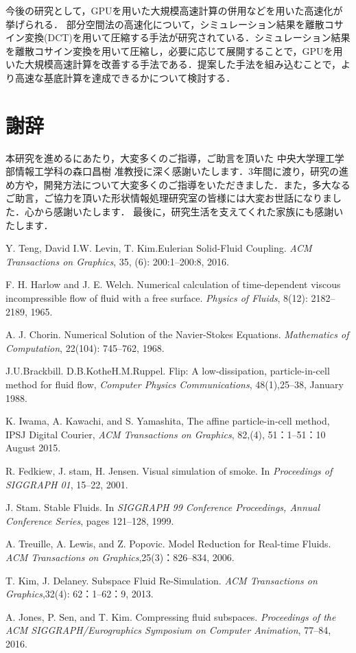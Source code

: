 \documentclass[a4j,12pt]{jreport}
\def\syaji{ \chapter*{謝辞} \addcontentsline{toc}{chapter}{謝辞}}
\begin{document}
今後の研究として，GPUを用いた大規模高速計算の併用などを用いた高速化が挙げられる．
部分空間法の高速化について，シミュレーション結果を離散コサイン変換(DCT)を用いて圧縮する手法\cite{subspaceDCT}が研究されている．シミュレーション結果を離散コサイン変換を用いて圧縮し，必要に応じて展開することで，GPUを用いた大規模高速計算を改善する手法である．提案した手法を組み込むことで，より高速な基底計算を達成できるかについて検討する．


\syaji
\par
本研究を進めるにあたり，大変多くのご指導，ご助言を頂いた
中央大学理工学部情報工学科の森口昌樹 准教授に深く感謝いたします．3年間に渡り，研究の進め方や，開発方法について大変多くのご指導をいただきました．また，多大なるご助言，ご協力を頂いた形状情報処理研究室の皆様には大変お世話になりました．心から感謝いたします．
最後に，研究生活を支えてくれた家族にも感謝いたします．
\begin{thebibliography}{99}
Y. Teng, David I.W. Levin, T. Kim.Eulerian Solid-Fluid Coupling. \textit{ACM Transactions on Graphics}, 35, (6):  200:1--200:8, 2016.

F. H. Harlow and J. E. Welch. Numerical calculation of time-dependent viscous incompressible flow of fluid with a free surface. \textit{Physics of Fluids}, 8(12): 2182--2189, 1965.

A. J. Chorin. Numerical Solution of the Navier-Stokes Equations. \textit{Mathematics of Computation}, 22(104): 745--762, 1968.

J.U.Brackbill. D.B.KotheH.M.Ruppel. Flip: A low-dissipation, particle-in-cell method for fluid flow, \textit{Computer Physics Communications}, 48(1),25--38, January 1988.

K. Iwama, A. Kawachi, and S. Yamashita, The affine particle-in-cell method, IPSJ Digital Courier, \textit{ACM Transactions on Graphics}, 82,(4), 51：1--51：10 August 2015.

R. Fedkiew, J. stam, H. Jensen. Visual simulation of smoke. In \textit{Proceedings of SIGGRAPH 01}, 15--22, 2001.

J. Stam. Stable Fluids. In \textit{SIGGRAPH 99 Conference Proceedings, Annual Conference Series}, pages 121--128, 1999.

A. Treuille, A. Lewis, and Z. Popovic. Model Reduction for Real-time Fluids. \textit{ACM Transactions on Graphics},25(3)：826--834, 2006.

T. Kim, J. Delaney. Subspace Fluid Re-Simulation. \textit{ACM Transactions on Graphics},32(4): 62：1--62：9, 2013.

A. Jones, P. Sen, and T. Kim. Compressing fluid subspaces. \textit{Proceedings of the ACM SIGGRAPH/Eurographics Symposium on Computer Animation}, 77--84, 2016.


\end{thebibliography}
\end{document}
